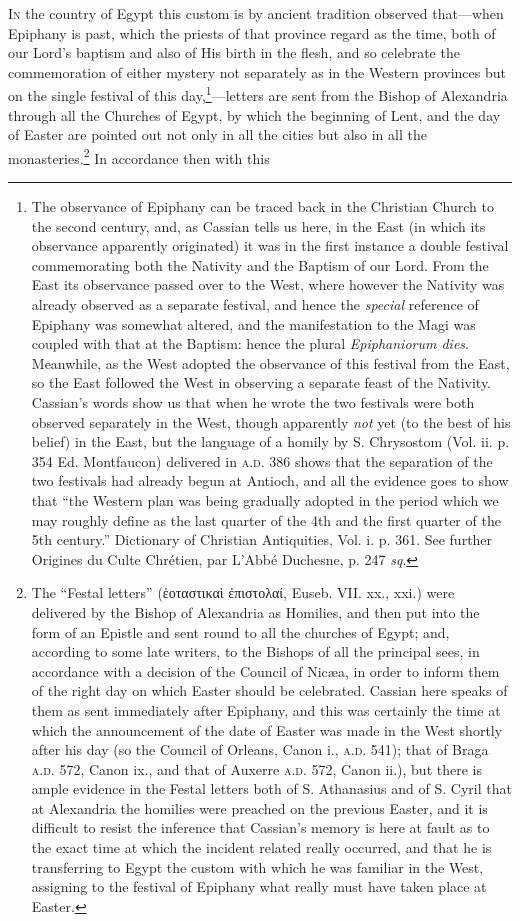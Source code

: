 \textsc{In} the country of Egypt this custom is by ancient tradition observed that—when Epiphany is past, which the priests of that province regard as the time, both of our Lord’s baptism and also of His birth in the flesh, and so celebrate the commemoration of either mystery not separately as in the Western provinces but on the single festival of this day,\footnote{The observance of Epiphany can be traced back in the Christian Church to the second century, and, as Cassian tells us here, in the East (in which its observance apparently originated) it was in the first instance a double festival commemorating both the Nativity and the Baptism of our Lord. From the East its observance passed over to the West, where however the Nativity was already observed as a separate festival, and hence the \emph{special} reference of Epiphany was somewhat altered, and the manifestation to the Magi was coupled with that at the Baptism: hence the plural \emph{Epiphaniorum dies}. Meanwhile, as the West adopted the observance of this festival from the East, so the East followed the West in observing a separate feast of the Nativity. Cassian’s words show us that when he wrote the two festivals were both observed separately in the West, though apparently \emph{not} yet (to the best of his belief) in the East, but the language of a homily by S. Chrysostom (Vol. ii. p. 354 Ed. Montfaucon) delivered in \textsc{a.d.} 386 shows that the separation of the two festivals had already begun at Antioch, and all the evidence goes to show that “the Western plan was being gradually adopted in the period which we may roughly define as the last quarter of the 4th and the first quarter of the 5th century.” Dictionary of Christian Antiquities, Vol. i. p. 361. See further Origines du Culte Chrétien, par L’Abbé Duchesne, p. 247 \emph{sq}.}—letters are sent from the Bishop of Alexandria through all the Churches of Egypt, by which the beginning of Lent, and the day of Easter are pointed out not only in all the cities but also in all the monasteries.\footnote{The “Festal letters” (\textgreek{ἑοταστικαὶ ἐπιστολαί}, Euseb. VII. xx., xxi.) were delivered by the Bishop of Alexandria as Homilies, and then put into the form of an Epistle and sent round to all the churches of Egypt; and, according to some late writers, to the Bishops of all the principal sees, in accordance with a decision of the Council of Nicæa, in order to inform them of the right day on which Easter should be celebrated. Cassian here speaks of them as sent immediately after Epiphany, and this was certainly the time at which the announcement of the date of Easter was made in the West shortly after his day (so the Council of Orleans, Canon i., \textsc{a.d.} 541); that of Braga \textsc{a.d.} 572, Canon ix., and that of Auxerre \textsc{a.d.} 572, Canon ii.), but there is ample evidence in the Festal letters both of S. Athanasius and of S. Cyril that at Alexandria the homilies were preached on the previous Easter, and it is difficult to resist the inference that Cassian’s memory is here at fault as to the exact time at which the incident related really occurred, and that he is transferring to Egypt the custom with which he was familiar in the West, assigning to the festival of Epiphany what really must have taken place at Easter.} In accordance then with this 